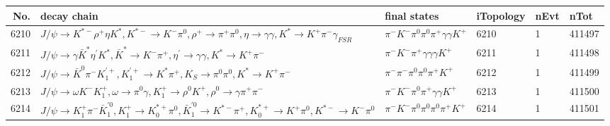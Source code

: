 \begin{table}[htbp] 
\begin{center}
\begin{small}
\begin{tabular}{rlllll}\hline\hline
 No. & decay chain & final states &  iTopology & nEvt & nTot \\\hline
6210&$J/\psi       \rightarrow K^{*-}         \rho^{+}      \eta          K^{*}          , K^{*-}          \rightarrow K^{-}          \pi^{0}        , \rho^{+}       \rightarrow \pi^{+}        \pi^{0}        , \eta           \rightarrow \gamma       \gamma       , K^{*}           \rightarrow K^{+}          \pi^{-}        \gamma_{FSR} $&$\pi^{-}        K^{-}          \pi^{0}        \pi^{0}        \pi^{+}        \gamma       \gamma       K^{+}          $& 6210&    1&411497\\
6211&$J/\psi       \rightarrow \gamma       \bar{K}^{*}   \eta^{\prime} K^{*}          , \bar{K}^{*}    \rightarrow K^{-}          \pi^{+}        , \eta^{\prime}  \rightarrow \gamma       \gamma       , K^{*}           \rightarrow K^{+}          \pi^{-}        $&$\pi^{-}        K^{-}          \pi^{+}        \gamma       \gamma       \gamma       K^{+}          $& 6211&    1&411498\\
6212&$J/\psi       \rightarrow \bar{K}^{0}   \pi^{-}        K_1^{'+}      , K_1^{'+}       \rightarrow K^{*}          \pi^{+}        , K_{S}           \rightarrow \pi^{0}        \pi^{0}        , K^{*}           \rightarrow K^{+}          \pi^{-}        $&$\pi^{-}        \pi^{-}        \pi^{0}        \pi^{0}        \pi^{+}        K^{+}          $& 6212&    1&411499\\
6213&$J/\psi       \rightarrow \omega         K^{-}          K_1^{+}        , \omega          \rightarrow \pi^{0}        \gamma       , K_1^{+}         \rightarrow \rho^{0}      K^{+}          , \rho^{0}       \rightarrow \gamma       \pi^{+}        \pi^{-}        $&$\pi^{-}        K^{-}          \pi^{0}        \pi^{+}        \gamma       \gamma       K^{+}          $& 6213&    1&411500\\
6214&$J/\psi       \rightarrow K_1^{+}        \pi^{-}        \bar{K}_1^{'0}, K_1^{+}         \rightarrow K_{0}^{*+}     \pi^{0}        , \bar{K}_1^{'0} \rightarrow K^{*-}         \pi^{+}        , K_{0}^{*+}      \rightarrow K^{+}          \pi^{0}        , K^{*-}          \rightarrow K^{-}          \pi^{0}        $&$\pi^{-}        K^{-}          \pi^{0}        \pi^{0}        \pi^{0}        \pi^{+}        K^{+}          $& 6214&    1&411501\\

\end{tabular}
\end{small}
\end{center}
\end{table}
